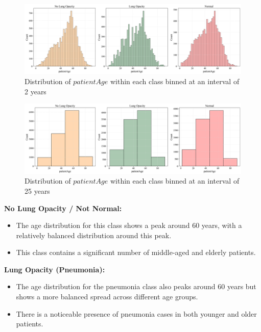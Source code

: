 \begin{figure}[H]
    \begin{center}
        \includegraphics[width = 1.0\textwidth]{figures/Figure5.png}
        \caption{Distribution of $patientAge$ within each class binned at an interval of 2 years}
        \label{fig:cha-2 figure3}
    \end{center}
\end{figure}

\begin{figure}[H]
    \begin{center}
        \includegraphics[width = 1.0\textwidth]{figures/Figure6.png}
        \caption{Distribution of $patientAge$ within each class binned at an interval of 25 years}
        \label{fig:cha-2 figure4}
    \end{center}
\end{figure}

\textbf{No Lung Opacity / Not Normal:}
\begin{itemize}
    \item The age distribution for this class shows a peak around 60 years, with a relatively balanced distribution around this peak.
    \item This class contains a significant number of middle-aged and elderly patients.
\end{itemize}

\textbf{Lung Opacity (Pneumonia):}
\begin{itemize}
    \item The age distribution for the pneumonia class also peaks around 60 years but shows a more balanced spread across different age groups.
    \item There is a noticeable presence of pneumonia cases in both younger and older patients.
\end{itemize}

